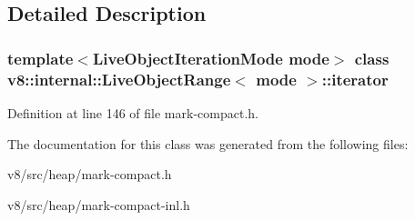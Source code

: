 \subsection{Detailed Description}
\subsubsection*{template$<$Live\+Object\+Iteration\+Mode mode$>$\newline
class v8\+::internal\+::\+Live\+Object\+Range$<$ mode $>$\+::iterator}



Definition at line 146 of file mark-\/compact.\+h.



The documentation for this class was generated from the following files\+:\begin{DoxyCompactItemize}
\item 
v8/src/heap/mark-\/compact.\+h\item 
v8/src/heap/mark-\/compact-\/inl.\+h\end{DoxyCompactItemize}
